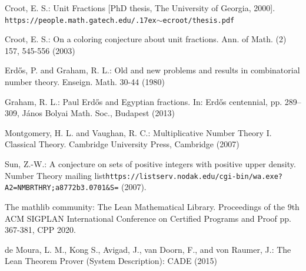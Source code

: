 \documentclass{amsart}
\begin{document}
\begin{thebibliography}{0}

Croot, E. S.: Unit Fractions [PhD thesis, The University of Georgia, 2000]. \texttt{https://people.math.gatech.edu/{{\raise.17ex\hbox{$\scriptstyle\sim$}}}ecroot/thesis.pdf}

Croot, E. S.: On a coloring conjecture about unit fractions. Ann. of Math. (2) 157, 545-556 (2003)

Erd\H{o}s, P. and Graham, R. L.: Old and new problems and results in combinatorial number theory. Enseign. Math. 30-44 (1980)

Graham, R. L.: Paul Erd\H{o}s and Egyptian fractions. In: Erd\H{o}s centennial, pp. 289–309, János Bolyai Math. Soc., Budapest (2013)

Montgomery, H. L. and Vaughan, R. C.: Multiplicative Number Theory I. Classical Theory. Cambridge University Press, Cambridge (2007)

Sun, Z.-W.: A conjecture on sets of positive integers with positive upper density. Number Theory mailing list\newline \texttt{https://listserv.nodak.edu/cgi-bin/wa.exe?A2=NMBRTHRY;a8772b3.0701{\&}S=} (2007). 

The mathlib community: The Lean Mathematical Library. Proceedings of the 9th ACM SIGPLAN International Conference on Certified Programs and Proof pp. 367-381, CPP 2020.

de Moura, L. M., Kong S., Avigad, J., van Doorn, F., and von Raumer, J.: The Lean Theorem Prover (System Description): CADE (2015)
\end{thebibliography}
\end{document}
